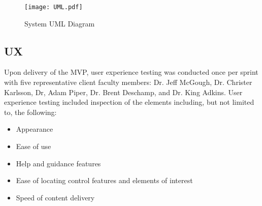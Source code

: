 	\begin{figure}[H]
	 	\centering
		\texttt{[image: UML.pdf]}
		\caption{System UML Diagram} 
	 	\label{fig:SystemUML}	
	\end{figure}
    
\subsection{UX}

Upon delivery of the MVP, user experience testing was conducted once per sprint with five representative client faculty members: Dr. Jeff McGough, Dr. Christer Karlsson, Dr, Adam Piper, Dr. Brent Deschamp, and Dr. King Adkins. User experience testing included inspection of the elements including, but not limited to, the following:

\begin{itemize}
	\item Appearance
	\item Ease of use
	\item Help and guidance features
	\item Ease of locating control features and elements of interest
	\item Speed of content delivery 
\end{itemize}




